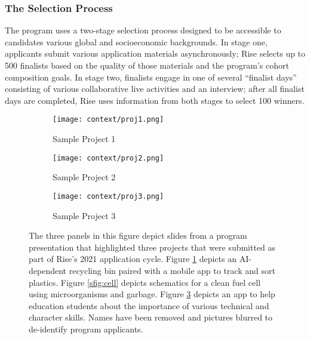 \subsubsection{The Selection Process}
The program uses a two-stage selection process designed to be accessible to candidates various global and socioeconomic backgrounds. In stage one, applicants submit various application materials asynchronously; Rise selects up to 500 finalists based on the quality of those materials and the program's cohort composition goals. In stage two, finalists engage in one of several ``finalist days'' consisting of various collaborative live activities and an interview; after all finalist days are completed, Rise uses information from both stages to select 100 winners.

\begin{figure}[htbp]
    \centering
    \begin{subfigure}{.45\textwidth}
        \centering
        \texttt{[image: context/proj1.png]}
        \caption{Sample Project 1}
        \label{sfig:can}
    \end{subfigure}
    \hfill
    \vspace{1em}
    \begin{subfigure}{.45\textwidth}
        \centering
        \texttt{[image: context/proj2.png]}
        \caption{Sample Project 2}
        \label{subfisfigg:cell}
    \end{subfigure}
    \hfill
    \vspace{1em}
    \begin{subfigure}{.45\textwidth}
        \centering
        \texttt{[image: context/proj3.png]} 
        \caption{Sample Project 3}
        \label{sfig:app}
    \end{subfigure}
    \caption{The three panels in this figure depict slides from a program presentation that highlighted three projects that were submitted as part of Rise's 2021 application cycle. Figure \ref{sfig:can} depicts an AI-dependent recycling bin paired with a mobile app to track and sort plastics. Figure \ref{sfig:cell} depicts schematics for a clean fuel cell using microorganisms and garbage. Figure \ref{sfig:app} depicts an app to help education students about the importance of various technical and character skills. Names have been removed and pictures blurred to de-identify program applicants.}
    \label{fig:example_projects}
\end{figure}

